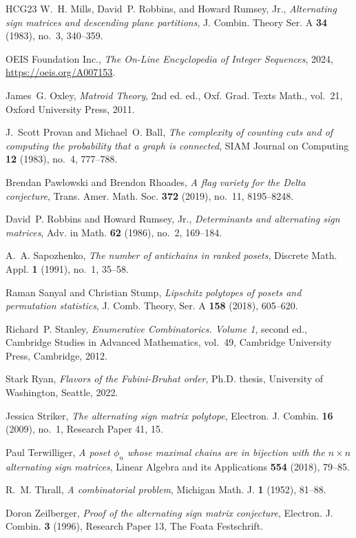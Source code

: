 \documentclass[12pt]{amsart}
\numberwithin{equation}{section}
\theoremstyle{definition}
\begin{document}
\begin{thebibliography}{HCG{\etalchar{+}}23}
W.~H. Mills, David~P. Robbins, and Howard Rumsey, Jr., \emph{Alternating sign
  matrices and descending plane partitions}, J. Combin. Theory Ser. A
  \textbf{34} (1983), no.~3, 340--359.

{OEIS Foundation Inc.}, \emph{The {O}n-{L}ine {E}ncyclopedia of {I}nteger
  {S}equences}, 2024, \url{https://oeis.org/A007153}.

James~G. Oxley, \emph{Matroid {T}heory}, 2nd ed. ed., Oxf. Grad. Texts Math.,
  vol.~21, Oxford University Press, 2011.

J.~Scott Provan and Michael~O. Ball, \emph{The complexity of counting cuts and
  of computing the probability that a graph is connected}, SIAM Journal on
  Computing \textbf{12} (1983), no.~4, 777--788.

Brendan Pawlowski and Brendon Rhoades, \emph{A flag variety for the {D}elta
  conjecture}, Trans. Amer. Math. Soc. \textbf{372} (2019), no.~11, 8195--8248.

David~P. Robbins and Howard Rumsey, Jr., \emph{Determinants and alternating
  sign matrices}, Adv. in Math. \textbf{62} (1986), no.~2, 169--184.

A.~A. Sapozhenko, \emph{The number of antichains in ranked posets}, Discrete
  Math. Appl. \textbf{1} (1991), no.~1, 35--58.

Raman Sanyal and Christian Stump, \emph{Lipschitz polytopes of posets and
  permutation statistics}, J. Comb. Theory, Ser. A \textbf{158} (2018),
  605--620.

Richard~P. Stanley, \emph{Enumerative {C}ombinatorics. {V}olume 1}, second ed.,
  Cambridge Studies in Advanced Mathematics, vol.~49, Cambridge University
  Press, Cambridge, 2012.

{Stark Ryan}, \emph{Flavors of the {Fubini-Bruhat} order}, Ph.D. thesis,
  University of Washington, Seattle, 2022.

Jessica Striker, \emph{The alternating sign matrix polytope}, Electron. J.
  Combin. \textbf{16} (2009), no.~1, Research Paper 41, 15.

Paul Terwilliger, \emph{A poset $\phi_n$ whose maximal chains are in bijection
  with the $n \times n$ alternating sign matrices}, Linear Algebra and its
  Applications \textbf{554} (2018), 79--85.

R.~M. Thrall, \emph{A combinatorial problem}, Michigan Math. J. \textbf{1}
  (1952), 81--88.

Doron Zeilberger, \emph{Proof of the alternating sign matrix conjecture},
  Electron. J. Combin. \textbf{3} (1996), Research Paper 13, The Foata
  Festschrift.

\end{thebibliography}
\end{document}
